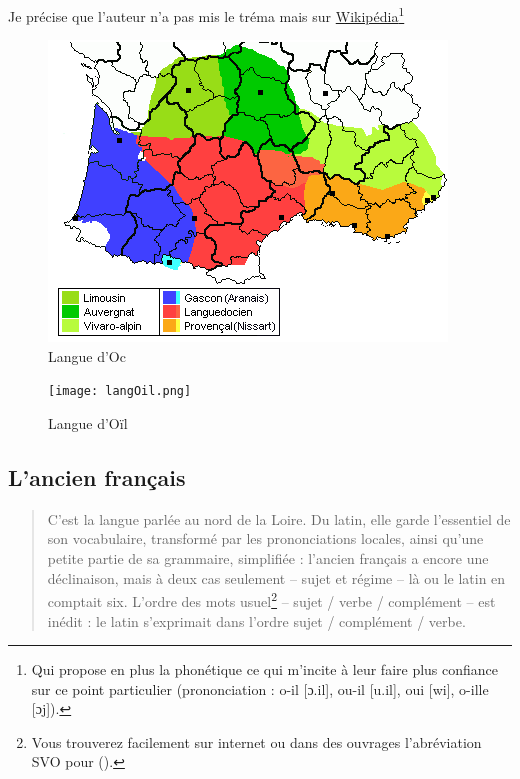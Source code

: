 Je précise que l'auteur n'a pas mis le tréma mais sur
\href{https://fr.wikipedia.org/wiki/Langue_d\%27o\%C3\%AFl}{Wikipédia}\footnote{Qui propose en plus la phonétique ce qui m'incite à
  leur faire plus confiance sur ce point particulier (prononciation :
  o-il [ɔ.il], ou-il [u.il], oui [wi], o-ille [ɔj]).}


\begin{subfigures}
  \label{fig:fig4a5}
  \begin{figure}
    \centering
    \includegraphics[scale=.725]{langOc.png}
    \caption{Langue d'Oc}
    \label{fig:fig4}
  \end{figure}
  \begin{figure}
    \centering
    \texttt{[image: langOil.png]}
    \caption{Langue d'Oïl}
    \label{fig:fig5}
  \end{figure}
\end{subfigures}

\subsection{L'ancien français}\label{subsec:ancienfr}

\begin{quotation}
  C'est la langue parlée au nord de la Loire. Du latin, elle garde
  l'essentiel de son vocabulaire, transformé par les prononciations
  locales, ainsi qu'une petite partie de sa grammaire, simplifiée :
  l'ancien français a encore une déclinaison, mais à deux cas
  seulement -- sujet et régime -- là ou le latin en comptait
  six. L'ordre des mots usuel\footnote{Vous trouverez facilement sur
    internet ou dans des ouvrages l'abréviation SVO pour  ().} -- sujet / verbe / complément -- est
  inédit : le latin s'exprimait dans l'ordre sujet / complément / verbe.
\end{quotation}

